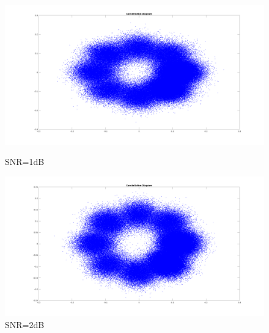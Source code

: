 \begin{spacing}{1.5}
\begin{figure}[H]
\begin{minipage}[t]{0.5\linewidth}
\centering
\includegraphics[width=0.9\columnwidth]{constellation7.png}
\caption{SNR=1dB}
\end{minipage}
\hfill
\begin{minipage}[t]{0.5\linewidth}
\centering
\includegraphics[width=0.9\columnwidth]{constellation8.png}
\caption{SNR=2dB}
\end{minipage}
\end{figure}



\end{spacing}

